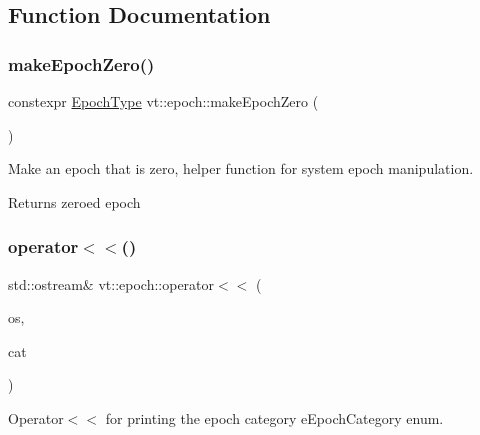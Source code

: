 \subsection{Function Documentation}
\mbox{\label{namespacevt_1_1epoch_a8fb587afa4725bab7d0d4d593331f5c3}} 
\subsubsection{\texorpdfstring{make\+Epoch\+Zero()}{makeEpochZero()}}
{\footnotesize\ttfamily constexpr \hyperlink{structvt_1_1epoch_1_1_epoch_type}{Epoch\+Type} vt\+::epoch\+::make\+Epoch\+Zero (\begin{DoxyParamCaption}{ }\end{DoxyParamCaption})\hspace{0.3cm}{\ttfamily [inline]}}



Make an epoch that is zero, helper function for system epoch manipulation. 

\begin{DoxyReturn}{Returns}
zero\textquotesingle{}ed epoch 
\end{DoxyReturn}
\mbox{\label{namespacevt_1_1epoch_ac6e7a477d5b11270b5b1e6f7a70e3bd5}} 
\subsubsection{\texorpdfstring{operator$<$$<$()}{operator<<()}}
{\footnotesize\ttfamily std\+::ostream\& vt\+::epoch\+::operator$<$$<$ (\begin{DoxyParamCaption}\item[{std\+::ostream \&}]{os,  }\item[{\hyperlink{namespacevt_1_1epoch_a956abe0aceef0d10a988de8acb002c7c}{e\+Epoch\+Category} const \&}]{cat }\end{DoxyParamCaption})\hspace{0.3cm}{\ttfamily [inline]}}



Operator$<$$<$ for printing the epoch category {\ttfamily e\+Epoch\+Category} enum. 

